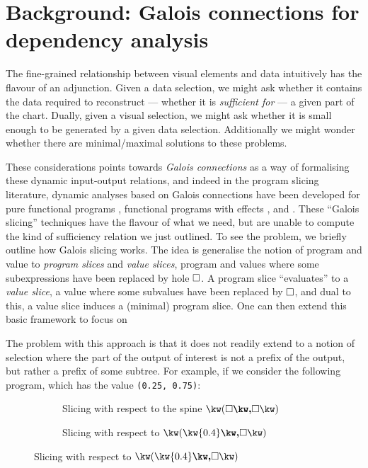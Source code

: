 \section{Background: Galois connections for dependency analysis}
\label{sec:background}



The fine-grained relationship between visual elements and data intuitively has the flavour of an adjunction. Given a data selection, we might ask whether it contains the data required to reconstruct --- whether it is \emph{sufficient for} --- a given part of the chart. Dually, given a visual selection, we might ask whether it is small enough to be generated by a given data selection. Additionally we might wonder whether there are minimal/maximal solutions to these problems.

These considerations points towards \emph{Galois connections} as a way of formalising these dynamic input-output relations, and indeed in the program slicing literature, dynamic analyses based on Galois connections have been developed for pure functional programs \cite{perera12a}, functional programs with effects \cite{ricciotti17}, and \piCalculus \cite{perera16d}. These ``Galois slicing'' techniques have the flavour of what we need, but are unable to compute the kind of sufficiency relation we just outlined. To see the problem, we briefly outline how Galois slicing works. The idea is generalise the notion of program and value to \emph{program slices} and \emph{value slices}, program and values where some subexpressions have been replaced by hole $\square$. A program slice ``evaluates'' to a \emph{value slice}, a value where some subvalues have been replaced by $\square$, and dual to this, a value slice induces a (minimal) program slice. One can then extend this basic framework to focus on

The problem with this approach is that it does not readily extend to a notion of selection where the part of the output of interest is not a prefix of the output, but rather a prefix of some subtree. For example, if we consider the following program, which has the value \lstinline{(0.25, 0.75)}:

\begin{figure}[H]
   \small
   \begin{subfigure}{0.45\textwidth}
      {}
   \caption{Slicing with respect to the spine $\exPair{\hole}{\hole}$}
   \end{subfigure}
   \begin{subfigure}{0.45\textwidth}
      {}
   \caption{Slicing with respect to $\exPair{\kw{0.4}}{\hole}$}
   \end{subfigure}
\end{figure}

